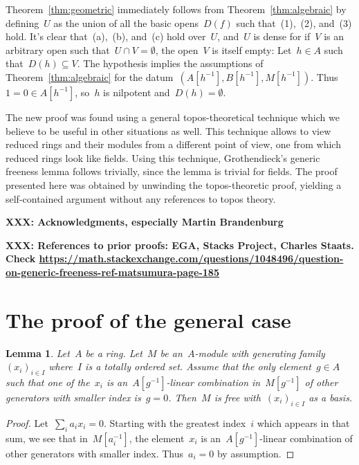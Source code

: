 \documentclass{amsart}
\theoremstyle{definition}
\theoremstyle{plain}
\newtheorem{lemma}[defn]{Lemma}
\theoremstyle{remark}
\newcommand{\XXX}[1]{\textbf{XXX: #1}}
\begin{document}
Theorem~\ref{thm:geometric} immediately follows from
Theorem~\ref{thm:algebraic} by defining~$U$ as the union of all the basic
opens~$D(f)$ such that~(1),~(2), and~(3) hold. It's clear that~(a),~(b),
and~(c) hold over~$U$, and~$U$ is dense for if~$V$ is an arbitrary open
such that~$U \cap V = \emptyset$, the open~$V$ is itself empty: Let~$h \in A$
such that~$D(h) \subseteq V$. The hypothesis implies the assumptions of
Theorem~\ref{thm:algebraic} for the datum~$(A[h^{-1}], B[h^{-1}], M[h^{-1}])$.
Thus~$1 = 0 \in A[h^{-1}]$, so~$h$ is nilpotent and~$D(h) = \emptyset$.

The new proof was found using a general topos-theoretical technique which we
believe to be useful in other situations as well. This technique allows to view
reduced rings and their modules from a different point of view, one from which
reduced rings look like fields. Using this technique, Grothendieck's generic freeness
lemma follows trivially, since the lemma is trivial for fields. The proof
presented here was obtained by unwinding the topos-theoretic proof, yielding a
self-contained argument without any references to topos theory.

\XXX{Acknowledgments, especially Martin Brandenburg}

\XXX{References to prior proofs: EGA, Stacks Project, Charles Staats. Check
\url{https://math.stackexchange.com/questions/1048496/question-on-generic-freeness-ref-matsumura-page-185}}


\section{The proof of the general case}

\begin{lemma}\label{lemma:basis}
Let~$A$ be a ring. Let~$M$ be an~$A$-module with generating
family~$(x_i)_{i \in I}$ where~$I$ is a totally ordered set. Assume that the
only element~$g \in A$ such that one of the~$x_i$ is an~$A[g^{-1}]$-linear
combination in~$M[g^{-1}]$ of other generators with smaller index is~$g = 0$.
Then~$M$ is free with~$(x_i)_{i \in I}$ as a basis.
\end{lemma}

\begin{proof}Let~$\sum_i a_i x_i = 0$. Starting with the greatest
index~$i$ which appears in that sum, we see that in~$M[a_i^{-1}]$, the
element~$x_i$ is an~$A[g^{-1}]$-linear combination of other generators with
smaller index. Thus~$a_i = 0$ by assumption.\end{proof}
\end{document}

